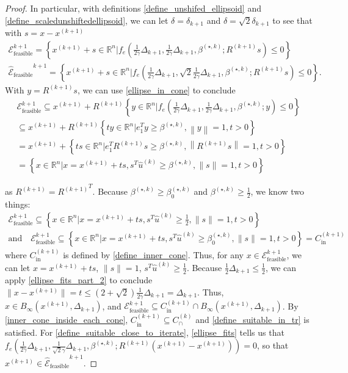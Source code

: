 \documentclass{article}
\theoremstyle{case}
\numberwithin{theorem}{subsection}
\newcommand{\bs}{{\beta^{(\star, k)}}}
\newcommand{\bsk}{{\beta_0^{(\star, k)}}}
\newcommand{\capcones}{{C^{(k)}_{\cap}}}
\newcommand{\dkpo}{\Delta_{k+1}}
\newcommand{\fcki}{{C^{(k+1)}_{\textrm{in}}}}
\newcommand{\huk}{{{\hat u}^{(k)}}}
\newcommand{\Rn}{\mathbb R^n}
\newcommand{\rotk}{{R^{(k+1)}}}
\newcommand{\trkpo}{{ B_{\infty}\left(\xkpo, \dkpo\right) }}
\newcommand{\xkpo}{{{x}^{(k+1)}}}
\newcommand{\sdkpo}{{\delta_{k+1}}}
\newcommand{\unshiftedellipsoidpo}{{\mathcal E^{k+1}_{\textrm{feasible}}}}
\newcommand{\scaledunshiftedellipsoidpo}{{{\mathcal {\hat E}_{\text{feasible}}}^{k+1}}}
\begin{document}
\begin{proof}
In particular, with definitions \cref{define_unshifed_ellipsoid} and \cref{define_scaledunshiftedellipsoid},
we can let $\delta = \sdkpo$ and $\delta = \sqrt{2}\sdkpo$ to see that with $s = x - \xkpo$
\begin{align*}
\unshiftedellipsoidpo = \left\{\xkpo + s \in \Rn | f_e\left(\frac 1 {2\gamma} \dkpo, \frac 1 {2\gamma} \dkpo, \bs; \rotk s \right) \le 0 \right\} \\
\scaledunshiftedellipsoidpo = \left\{\xkpo + s \in \Rn | f_e\left(\frac 1 {2\gamma} \dkpo, \sqrt{2} \frac {1}{2\gamma}\dkpo, \bs; \rotk s\right) \le 0 \right\}.
\end{align*}
With $y = \rotk s$,  we can use \cref{ellipse_in_cone} to conclude
\begin{align*}
\unshiftedellipsoidpo
\subseteq \xkpo + \rotk\left\{y \in \Rn | f_e\left(\frac 1 {2\gamma} \dkpo, \frac 1 {2\gamma} \dkpo, \bs; y \right) \le 0 \right\} \\
\subseteq  \xkpo + \rotk \left\{t y \in \Rn \bigg| e_1^Ty \ge \bs, \left\|y\right\| = 1, t > 0 \right\} \\
= \xkpo + \left\{t s \in \Rn \bigg| e_1^T\rotk s \ge \bs, \left\|\rotk s\right\| = 1, t > 0 \right\} \\
= \left\{x  \in \Rn \bigg| x = \xkpo + ts, s^T\huk \ge \bs, \|s\| = 1, t > 0 \right\}
\end{align*}

as $\rotk = \rotk^T$.
Because $\bs \ge \bsk$ and $\bs \ge \frac 1 2$, we know two things:
\begin{align*}
\unshiftedellipsoidpo \subseteq \left\{x \in \Rn | x = \xkpo + ts, s^T\huk \ge \frac 1 2, \|s\|= 1, t > 0 \right\} \\
\textrm{and} \quad \unshiftedellipsoidpo \subseteq \left\{x \in \Rn | x = \xkpo + ts, s^T\huk \ge \bsk, \|s\|= 1, t > 0 \right\} = \fcki
\end{align*}
where $\fcki$ is defined by \cref{define_inner_cone}.
Thus, for any $x \in \unshiftedellipsoidpo$, we can let $x = \xkpo + ts$, $\|s\| = 1$, $s^T\huk \ge \frac 1 2$.
Because $\frac 1 2 \dkpo \le \frac 1 2$, we can apply \cref{ellipse_fits_part_2} to conclude $\|x - \xkpo\| = t \le \left(2 + \sqrt{2}\right)\frac 1 {2\gamma} \dkpo = \dkpo$.
Thus, $x \in \trkpo$, and $\unshiftedellipsoidpo \subseteq \fcki \cap \trkpo$.
By \cref{inner_cone_inside_each_cone}, $\fcki \subseteq \capcones$ and \cref{define_suitable_in_tr} is satisfied.
For \cref{define_suitable_close_to_iterate}, \cref{ellipse_fits} tells us that
$f_e\left(\frac 1 {2\gamma} \dkpo, \frac 1 {\sqrt{2}\gamma}\dkpo, \bs; \rotk\left(\xkpo - \xkpo\right)\right) = 0$, so that $\xkpo \in \scaledunshiftedellipsoidpo$.
\end{proof}
\end{document}
